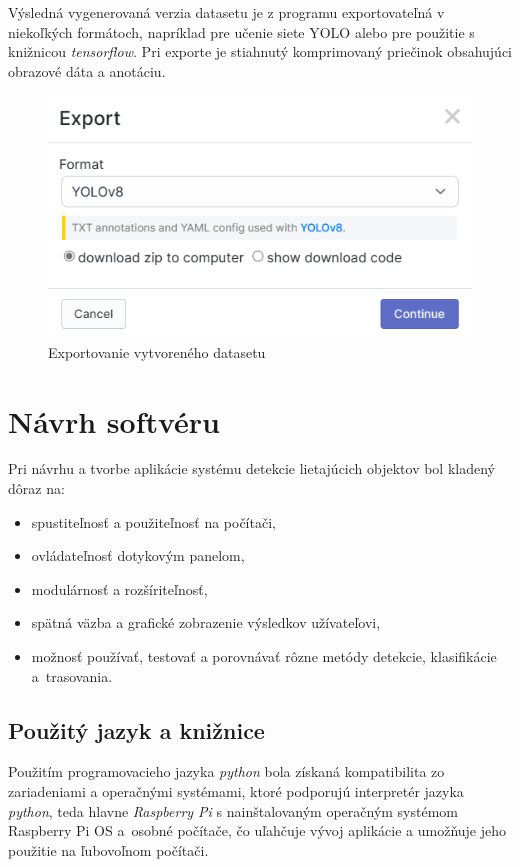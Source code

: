     Výsledná vygenerovaná verzia datasetu je z programu exportovateľná v niekoľkých formátoch, napríklad pre učenie siete \ac{YOLO} alebo pre použitie s knižnicou \emph{tensorflow}. Pri exporte je stiahnutý komprimovaný priečinok obsahujúci obrazové dáta a anotáciu.

    \begin{figure}[H]
        \centering
        \includegraphics[width=.5\textwidth]{obrazky/roboflow/export.png}
        \caption{Exportovanie vytvoreného datasetu}
    \end{figure}

\chapter{Návrh softvéru}

    Pri návrhu a tvorbe aplikácie systému detekcie lietajúcich objektov bol kladený dôraz na:
    \begin{itemize}
        \item spustiteľnosť a použiteľnosť na počítači,
        \item ovládateľnosť dotykovým panelom,
        \item modulárnosť a rozšíriteľnosť,
        \item spätná väzba a grafické zobrazenie výsledkov užívateľovi,
        \item možnosť používať, testovať a porovnávať rôzne metódy detekcie, klasifikácie a~trasovania.
    \end{itemize}

    \section{Použitý jazyk a knižnice}

        Použitím programovacieho jazyka \emph{python} bola získaná kompatibilita zo zariadeniami a operačnými systémami, ktoré podporujú interpretér jazyka \emph{python}, teda hlavne \emph{Raspberry Pi} s nainštalovaným operačným systémom Raspberry Pi OS a~osobné počítače, čo uľahčuje vývoj aplikácie a umožňuje jeho použitie na ľubovoľnom počítači.

